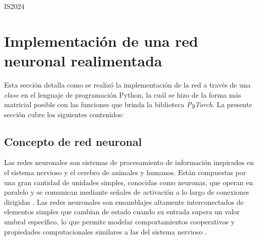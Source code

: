\documentclass{article}
\begin{document}
\begin{center}
    IS2024\newpage{}
    \par\end{center}

\tableofcontents
\newpage

\section{Implementación de una red neuronal realimentada}

Esta sección detalla como se realizó la implementación de la red a través de una \textit{clase} en el lenguaje de programación Python, la cuál se hizo de la forma más matricial posible con las funciones que brinda la biblioteca \textit{PyTorch}. La presente sección cubre los siguientes contenidos:




\subsection{Concepto de red neuronal}\label{sec:neural_net}

Las redes neuronales son sistemas de procesamiento de información inspirados en el sistema nervioso y el cerebro de animales y humanos. Están compuestas por una gran cantidad de unidades simples, conocidas como neuronas, que operan en paralelo y se comunican mediante señales de activación a lo largo de conexiones dirigidas \cite{Kruse2016Introduction}. Las redes neuronales son ensamblajes altamente interconectados de elementos simples que cambian de estado cuando su entrada supera un valor umbral específico, lo que permite modelar comportamientos cooperativos y propiedades computacionales similares a las del sistema nervioso \cite{Sompolinsky1988STATISTICAL}.
\end{document}
